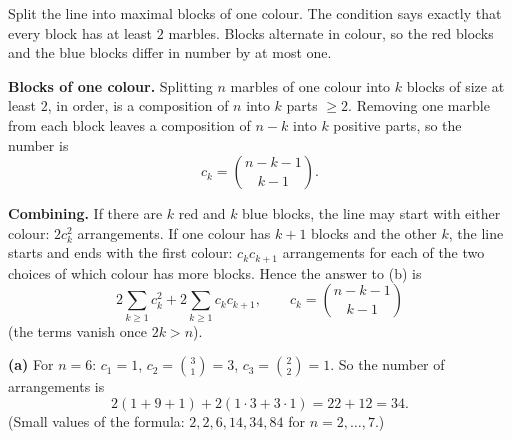 Split the line into maximal blocks of one colour. The condition says exactly that every block has at least $2$ marbles. Blocks alternate in colour, so the red blocks and the blue blocks differ in number by at most one.

\textbf{Blocks of one colour.} Splitting $n$ marbles of one colour into $k$ blocks of size at least $2$, in order, is a composition of $n$ into $k$ parts $\ge2$. Removing one marble from each block leaves a composition of $n-k$ into $k$ positive parts, so the number is
\[
c_k=\binom{n-k-1}{k-1}.
\]

\textbf{Combining.} If there are $k$ red and $k$ blue blocks, the line may start with either colour: $2c_k^2$ arrangements. If one colour has $k+1$ blocks and the other $k$, the line starts and ends with the first colour: $c_kc_{k+1}$ arrangements for each of the two choices of which colour has more blocks. Hence the answer to (b) is
\[
\boxed{\;2\sum_{k\ge1}c_k^2+2\sum_{k\ge1}c_kc_{k+1},\qquad c_k=\binom{n-k-1}{k-1}\;}
\]
(the terms vanish once $2k>n$).

\textbf{(a)} For $n=6$: $c_1=1$, $c_2=\binom31=3$, $c_3=\binom22=1$. So the number of arrangements is
\[
2(1+9+1)+2(1\cdot3+3\cdot1)=22+12=\boxed{34}.
\]
(Small values of the formula: $2,2,6,14,34,84$ for $n=2,\dots,7$.)

